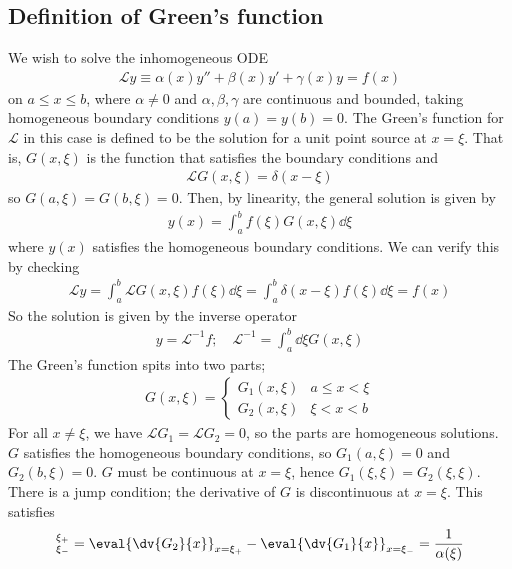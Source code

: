 \subsection{Definition of Green's function}
We wish to solve the inhomogeneous ODE
\begin{align*}
	\mathcal L y \equiv \alpha(x) y'' + \beta(x) y' + \gamma(x) y = f(x)
\end{align*}
on $a \leq x \leq b$, where $\alpha \neq 0$ and $\alpha, \beta, \gamma$ are continuous and bounded, taking homogeneous boundary conditions $y(a) = y(b) = 0$.
The Green's function for $\mathcal L$ in this case is defined to be the solution for a unit point source at $x = \xi$.
That is, $G(x,\xi)$ is the function that satisfies the boundary conditions and
\begin{align*}
	\mathcal L G(x,\xi) = \delta(x-\xi)
\end{align*}
so $G(a,\xi) = G(b,\xi) = 0$.
Then, by linearity, the general solution is given by
\begin{align*}
	y(x) = \int_a^b f(\xi) G(x,\xi) \dd{\xi}
\end{align*}
where $y(x)$ satisfies the homogeneous boundary conditions.
We can verify this by checking
\begin{align*}
	\mathcal L y = \int_a^b \mathcal L G(x,\xi) f(\xi) \dd{\xi} = \int_a^b \delta(x-\xi) f(\xi) \dd{\xi} = f(x)
\end{align*}
So the solution is given by the inverse operator
\begin{align*}
	y = \mathcal L^{-1} f;\quad \mathcal L^{-1} = \int_a^b \dd{\xi} G(x,\xi)
\end{align*}
The Green's function spits into two parts;
\begin{align*}
	G(x,\xi) = \begin{cases}
		G_1(x,\xi) & a \leq x < \xi \\
		G_2(x,\xi) & \xi < x < b
	\end{cases}
\end{align*}
For all $x \neq \xi$, we have $\mathcal L G_1 = \mathcal L G_2 = 0$, so the parts are homogeneous solutions.
$G$ satisfies the homogeneous boundary conditions, so $G_1(a, \xi) = 0$ and $G_2(b, \xi) = 0$.
$G$ must be continuous at $x = \xi$, hence $G_1(\xi, \xi) = G_2(\xi, \xi)$.
There is a jump condition; the derivative of $G$ is discontinuous at $x = \xi$.
This satisfies
\begin{align*}
	[G']_{\xi_-}^{\xi_+} = \eval{\dv{G_2}{x}}_{x = \xi_+} - \eval{\dv{G_1}{x}}_{x = \xi_-} = \frac{1}{\alpha(\xi)}
\end{align*}

